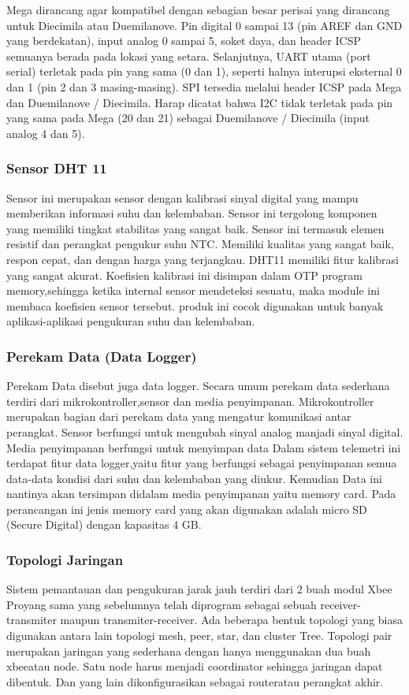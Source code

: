 Mega dirancang agar kompatibel dengan sebagian besar perisai yang dirancang untuk Diecimila atau Duemilanove. Pin digital 0 sampai 13 (pin AREF dan GND yang berdekatan), input analog 0 sampai 5, soket daya, dan header ICSP semuanya berada pada lokasi yang setara. Selanjutnya, UART utama (port serial) terletak pada pin yang sama (0 dan 1), seperti halnya interupsi eksternal 0 dan 1 (pin 2 dan 3 masing-masing). SPI tersedia melalui header ICSP pada Mega dan Duemilanove / Diecimila. Harap dicatat bahwa I2C tidak terletak pada pin yang sama pada Mega (20 dan 21) sebagai Duemilanove / Diecimila (input analog 4 dan 5).
\subsubsection{Sensor DHT 11}
Sensor ini merupakan sensor dengan kalibrasi sinyal digital yang mampu memberikan informasi suhu dan kelembaban. Sensor ini tergolong komponen yang memiliki tingkat stabilitas yang sangat baik. Sensor ini termasuk elemen resistif dan perangkat pengukur suhu NTC.
Memiliki kualitas yang sangat baik, respon cepat, dan dengan harga yang
terjangkau. DHT11 memiliki fitur kalibrasi yang sangat akurat. Koefisien kalibrasi ini disimpan dalam OTP program memory,sehingga ketika internal sensor mendeteksi sesuatu, maka module ini membaca koefisien sensor tersebut. produk ini cocok digunakan untuk banyak aplikasi-aplikasi pengukuran suhu dan kelembaban.

\subsubsection{Perekam Data (Data Logger)}
 Perekam Data disebut juga data logger. Secara umum perekam data sederhana terdiri dari mikrokontroller,sensor dan media penyimpanan.
Mikrokontroller merupakan bagian dari perekam data yang mengatur komunikasi antar perangkat. Sensor berfungsi untuk mengubah sinyal analog manjadi sinyal digital. Media penyimpanan berfungsi untuk menyimpan data Dalam sistem telemetri ini terdapat fitur data logger,yaitu fitur yang berfungsi sebagai penyimpanan semua data-data kondisi dari suhu dan kelembaban yang diukur. Kemudian Data ini nantinya akan
tersimpan didalam media penyimpanan yaitu memory card. Pada perancangan ini jenis memory card yang akan digunakan adalah micro SD 
(Secure Digital) dengan kapasitas 4 GB.

\subsubsection{Topologi Jaringan}
Sistem pemantauan dan pengukuran jarak jauh terdiri dari 2 buah modul 
Xbee Proyang sama yang sebelumnya telah diprogram sebagai sebuah receiver-transmiter maupun transmiter-receiver. Ada beberapa bentuk topologi yang biasa digunakan antara lain topologi mesh, peer, star, dan cluster Tree.
Topologi pair merupakan jaringan yang sederhana dengan hanya menggunakan dua buah xbeeatau node. Satu node harus menjadi coordinator sehingga jaringan dapat dibentuk. Dan yang lain dikonfigurasikan sebagai routeratau perangkat akhir.

